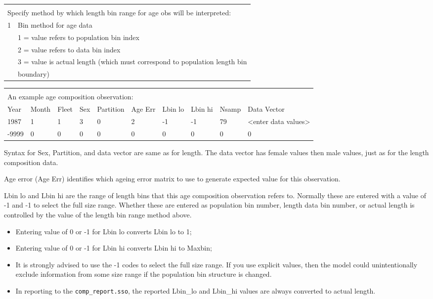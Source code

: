 \begin{tabular}{p{1cm} p{14cm}}
	 & \\
	\multicolumn{2}{l}{Specify method by which length bin range for age obs will be interpreted:} \\
	\hline
	1 & Bin method for age data \Tstrut\\
	  & 1 = value refers to population bin index \\
	  & 2 = value refers to data bin index \\
	  & 3 = value is actual length (which must correspond to population length bin \\
	  & boundary) \Bstrut\\
	 \hline
\end{tabular}

\begin{tabular}{p{1cm} p{1cm} p{1cm} p{1cm} p{1.5cm} p{1cm} p{1cm} p{1cm} p{1cm} p{2.5cm}}
	\multicolumn{10}{l}{} \\
	\multicolumn{10}{l}{An example age composition observation:} \\
	\hline
	Year & Month & Fleet & Sex & Partition & Age Err & Lbin lo & Lbin hi & Nsamp & Data Vector \Tstrut\\
	\hline
	1987 & 1 & 1 & 3 & 0 & 2 & -1 & -1 & 79 & <enter data values> \Tstrut\\
	-9999 & 0 & 0 & 0 & 0 & 0 & 0 & 0 & 0 & 0 \Bstrut\\
	\hline
\end{tabular}

Syntax for Sex, Partition, and data vector are same as for length. The data vector has female values then male values, just as for the length composition data.


Age error (Age Err) identifies which ageing error matrix to use to generate expected value for this observation.

Lbin lo and Lbin hi are the range of length bins that this age composition observation refers to. Normally these are entered with a value of -1 and -1 to select the full size range. Whether these are entered as population bin number, length data bin number, or actual length is controlled by the value of the length bin range method above.

\begin{itemize}
	\item Entering value of 0 or -1 for Lbin lo converts Lbin lo to 1;
	\item Entering value of 0 or -1 for Lbin hi converts Lbin hi to Maxbin;
	\item It is strongly advised to use the -1 codes to select the full size range. If you use explicit values, then the model could unintentionally exclude information from some size range if the population bin structure is changed.
	\item In reporting to the \texttt{comp\_report.sso}, the reported Lbin\_lo and Lbin\_hi values are always converted to actual length.
\end{itemize}

